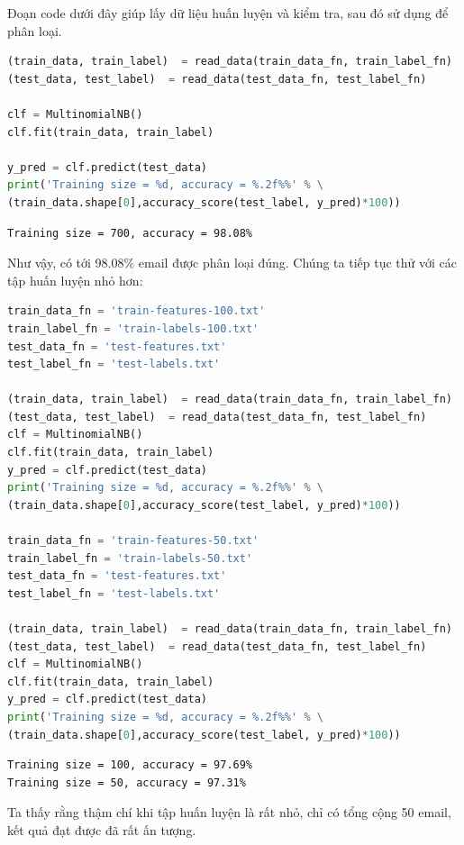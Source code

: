 Đoạn code dưới đây giúp lấy dữ liệu huấn luyện và kiểm tra, sau đó sử dụng  để phân loại.
\begin{lstlisting}[language=Python]
(train_data, train_label)  = read_data(train_data_fn, train_label_fn)
(test_data, test_label)  = read_data(test_data_fn, test_label_fn)

clf = MultinomialNB()
clf.fit(train_data, train_label)

y_pred = clf.predict(test_data)
print('Training size = %d, accuracy = %.2f%%' % \
(train_data.shape[0],accuracy_score(test_label, y_pred)*100))
\end{lstlisting}
\kq
\begin{lstlisting}
Training size = 700, accuracy = 98.08%
\end{lstlisting}


Như vậy, có tới 98.08\% email được phân loại đúng. Chúng ta tiếp tục thử với các tập huấn luyện nhỏ hơn:


\begin{lstlisting}[language=Python]
train_data_fn = 'train-features-100.txt'
train_label_fn = 'train-labels-100.txt'
test_data_fn = 'test-features.txt'
test_label_fn = 'test-labels.txt'

(train_data, train_label)  = read_data(train_data_fn, train_label_fn)
(test_data, test_label)  = read_data(test_data_fn, test_label_fn)
clf = MultinomialNB()
clf.fit(train_data, train_label)
y_pred = clf.predict(test_data)
print('Training size = %d, accuracy = %.2f%%' % \
(train_data.shape[0],accuracy_score(test_label, y_pred)*100))

train_data_fn = 'train-features-50.txt'
train_label_fn = 'train-labels-50.txt'
test_data_fn = 'test-features.txt'
test_label_fn = 'test-labels.txt'

(train_data, train_label)  = read_data(train_data_fn, train_label_fn)
(test_data, test_label)  = read_data(test_data_fn, test_label_fn)
clf = MultinomialNB()
clf.fit(train_data, train_label)
y_pred = clf.predict(test_data)
print('Training size = %d, accuracy = %.2f%%' % \
(train_data.shape[0],accuracy_score(test_label, y_pred)*100))
\end{lstlisting}
\kq
\begin{lstlisting}
Training size = 100, accuracy = 97.69%
Training size = 50, accuracy = 97.31%
\end{lstlisting}


Ta thấy rằng thậm chí khi tập huấn luyện là rất nhỏ, chỉ có tổng cộng 50 email, kết
quả đạt được đã rất ấn tượng.

